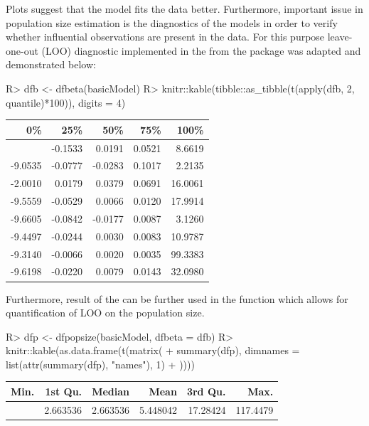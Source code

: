 \documentclass[
]{jss}
\newcommand{\1}{\mathcal{I}} \newcommand{\bZero}{\boldsymbol{0}}
\begin{document}
Plots suggest that the  model fits the data better.
Furthermore, important issue in population size estimation is the
diagnostics of the models in order to verify whether influential
observations are present in the data. For this purpose leave-one-out
(LOO) diagnostic implemented in the  from the 
package was adapted and demonstrated below:

\begin{CodeInput}
R> dfb <- dfbeta(basicModel)
R> knitr::kable(tibble::as_tibble(t(apply(dfb, 2, quantile)*100)), digits = 4)
\end{CodeInput}

\begin{longtable}[]{@{}rrrrr@{}}
\toprule\noalign{}
0\% & 25\% & 50\% & 75\% & 100\% \\
\midrule\noalign{}
\endhead
\bottomrule\noalign{}
\endlastfoot
-0.9909 & -0.1533 & 0.0191 & 0.0521 & 8.6619 \\
-9.0535 & -0.0777 & -0.0283 & 0.1017 & 2.2135 \\
-2.0010 & 0.0179 & 0.0379 & 0.0691 & 16.0061 \\
-9.5559 & -0.0529 & 0.0066 & 0.0120 & 17.9914 \\
-9.6605 & -0.0842 & -0.0177 & 0.0087 & 3.1260 \\
-9.4497 & -0.0244 & 0.0030 & 0.0083 & 10.9787 \\
-9.3140 & -0.0066 & 0.0020 & 0.0035 & 99.3383 \\
-9.6198 & -0.0220 & 0.0079 & 0.0143 & 32.0980 \\
\end{longtable}

Furthermore, result of the  can be further used in the
function  which allows for quantification of LOO on the
population size.

\begin{CodeInput}
R> dfp <- dfpopsize(basicModel, dfbeta = dfb)
R> knitr::kable(as.data.frame(t(matrix(
+   summary(dfp), dimnames = list(attr(summary(dfp), "names"), 1)
+ ))))
\end{CodeInput}

\begin{longtable}[]{@{}rrrrrr@{}}
\toprule\noalign{}
Min. & 1st Qu. & Median & Mean & 3rd Qu. & Max. \\
\midrule\noalign{}
\endhead
\bottomrule\noalign{}
\endlastfoot
-4236.412 & 2.663536 & 2.663536 & 5.448042 & 17.28424 & 117.4479 \\
\end{longtable}
\end{document}
